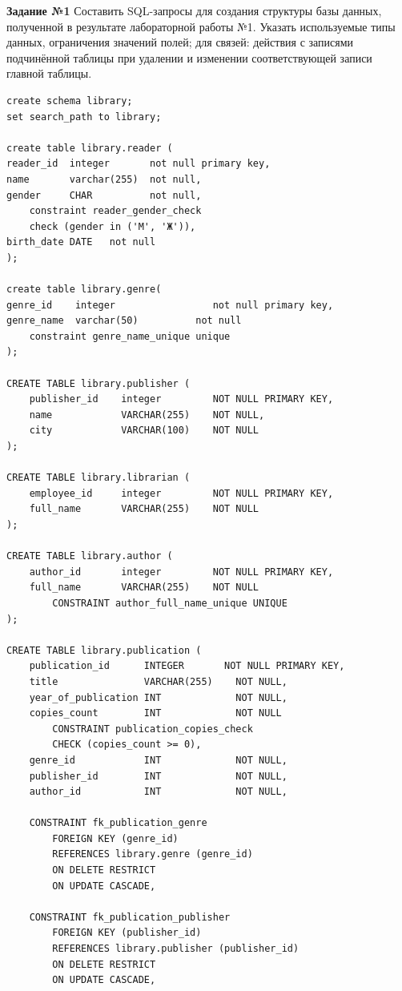 \textbf{Задание №1} Составить SQL-запросы для создания структуры базы данных, полученной в результате лабораторной работы №1. Указать используемые типы данных, ограничения значений полей; для связей: действия с записями подчинённой таблицы при удалении и изменении соответствующей записи главной таблицы.  \label{sec:1} 

    \begin{verbatim}
create schema library;
set search_path to library;

create table library.reader (
reader_id  integer       not null primary key,
name       varchar(255)  not null,
gender     CHAR          not null,
	constraint reader_gender_check
	check (gender in ('М', 'Ж')),
birth_date DATE	  not null
);

create table library.genre(
genre_id 	integer 		        not null primary key,
genre_name 	varchar(50)  		 not null
	constraint genre_name_unique unique
);

CREATE TABLE library.publisher (
    publisher_id    integer         NOT NULL PRIMARY KEY,
    name            VARCHAR(255)    NOT NULL,
    city            VARCHAR(100)    NOT NULL
);

CREATE TABLE library.librarian (
    employee_id     integer         NOT NULL PRIMARY KEY,
    full_name       VARCHAR(255)    NOT NULL
);

CREATE TABLE library.author (
    author_id       integer         NOT NULL PRIMARY KEY,
    full_name       VARCHAR(255)    NOT NULL
        CONSTRAINT author_full_name_unique UNIQUE
);

CREATE TABLE library.publication (
    publication_id      INTEGER       NOT NULL PRIMARY KEY,
    title               VARCHAR(255)    NOT NULL,
    year_of_publication INT             NOT NULL,
    copies_count        INT             NOT NULL
        CONSTRAINT publication_copies_check
        CHECK (copies_count >= 0),
    genre_id            INT             NOT NULL,
    publisher_id        INT             NOT NULL,
    author_id           INT             NOT NULL,   

    CONSTRAINT fk_publication_genre
        FOREIGN KEY (genre_id)
        REFERENCES library.genre (genre_id)
        ON DELETE RESTRICT
        ON UPDATE CASCADE,

    CONSTRAINT fk_publication_publisher
        FOREIGN KEY (publisher_id)
        REFERENCES library.publisher (publisher_id)
        ON DELETE RESTRICT
        ON UPDATE CASCADE,


\end{verbatim}
